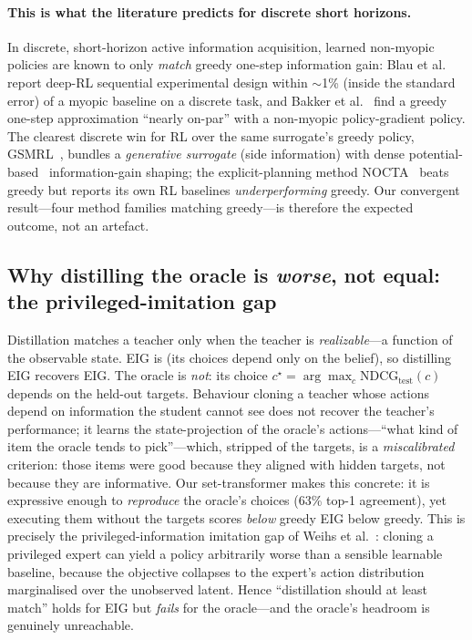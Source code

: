 \documentclass[11pt]{article}
\begin{document}
\paragraph{This is what the literature predicts for discrete short horizons.} In discrete, short-horizon active
information acquisition, learned non-myopic policies are known to only \emph{match} greedy one-step information gain:
Blau et al.~\cite{blau22} report deep-RL sequential experimental design within $\sim$1\% (inside the standard error)
of a myopic baseline on a discrete task, and Bakker et al.~\cite{bakker20} find a greedy one-step approximation
``nearly on-par'' with a non-myopic policy-gradient policy. The clearest discrete win for RL over the same surrogate's
greedy policy, GSMRL~\cite{gsmrl}, bundles a \emph{generative surrogate} (side information) with dense potential-based~\cite{ng99}
information-gain shaping; the explicit-planning method NOCTA~\cite{nocta} beats greedy but reports its own RL baselines
\emph{underperforming} greedy. Our convergent result---four method families matching greedy---is therefore the
expected outcome, not an artefact.

\subsection{Why distilling the oracle is \emph{worse}, not equal: the privileged-imitation gap}\label{sec:gap}
Distillation matches a teacher only when the teacher is \emph{realizable}---a function of the observable state. EIG is
(its choices depend only on the belief), so distilling EIG recovers EIG. The oracle is \emph{not}: its choice
$c^\star=\arg\max_c \mathrm{NDCG}_{\text{test}}(c)$ depends on the held-out targets. Behaviour cloning a teacher whose
actions depend on information the student cannot see does not recover the teacher's performance; it learns the
state-projection of the oracle's actions---``what kind of item the oracle tends to pick''---which, stripped of the
targets, is a \emph{miscalibrated} criterion: those items were good because they aligned with hidden targets, not
because they are informative. Our set-transformer makes this concrete: it is expressive enough to \emph{reproduce} the
oracle's choices (63\% top-1 agreement), yet executing them without the targets scores \emph{below} greedy EIG
below greedy. This is precisely the privileged-information imitation gap of Weihs et al.~\cite{weihs21}:
cloning a privileged expert can yield a policy arbitrarily worse than a sensible learnable baseline, because the
objective collapses to the expert's action distribution marginalised over the unobserved latent. Hence ``distillation
should at least match'' holds for EIG but \emph{fails} for the oracle---and the oracle's headroom is genuinely
unreachable.
\end{document}
